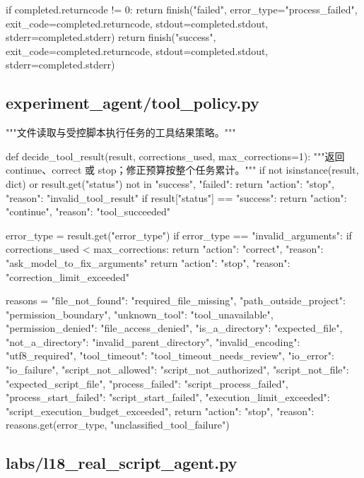 \begin{Code}
    if completed.returncode != 0:
        return finish("failed", error_type="process_failed", exit_code=completed.returncode,
                      stdout=completed.stdout, stderr=completed.stderr)
    return finish("success", exit_code=completed.returncode,
                  stdout=completed.stdout, stderr=completed.stderr)
\end{Code}

\subsection{experiment\_agent/tool\_policy.py}

\begin{Code}
"""文件读取与受控脚本执行任务的工具结果策略。"""


def decide_tool_result(result, corrections_used, max_corrections=1):
    """返回 continue、correct 或 stop；修正预算按整个任务累计。"""
    if not isinstance(result, dict) or result.get("status") not in {"success", "failed"}:
        return {"action": "stop", "reason": "invalid_tool_result"}
    if result["status"] == "success":
        return {"action": "continue", "reason": "tool_succeeded"}

    error_type = result.get("error_type")
    if error_type == "invalid_arguments":
        if corrections_used < max_corrections:
            return {"action": "correct", "reason": "ask_model_to_fix_arguments"}
        return {"action": "stop", "reason": "correction_limit_exceeded"}

    reasons = {
        "file_not_found": "required_file_missing",
        "path_outside_project": "permission_boundary",
        "unknown_tool": "tool_unavailable",
        "permission_denied": "file_access_denied",
        "is_a_directory": "expected_file",
        "not_a_directory": "invalid_parent_directory",
        "invalid_encoding": "utf8_required",
        "tool_timeout": "tool_timeout_needs_review",
        "io_error": "io_failure",
        "script_not_allowed": "script_not_authorized",
        "script_not_file": "expected_script_file",
        "process_failed": "script_process_failed",
        "process_start_failed": "script_start_failed",
        "execution_limit_exceeded": "script_execution_budget_exceeded",
    }
    return {"action": "stop", "reason": reasons.get(error_type, "unclassified_tool_failure")}
\end{Code}

\subsection{labs/l18\_real\_script\_agent.py}

